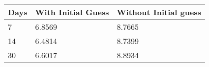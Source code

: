 \begin{tabular}{lll}
Days & With Initial Guess & Without Initial guess \\ 
\hline 
7 & 6.8569 & 8.7665 \\ 
14 & 6.4814 & 8.7399 \\ 
30 & 6.6017 & 8.8934 \\ 
\hline 
\end{tabular}
